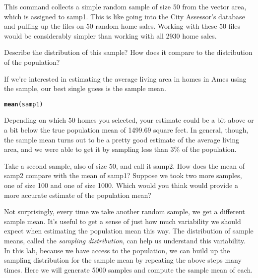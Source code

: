 \documentclass{article}\usepackage[]{graphicx}\usepackage[]{color}
\makeatletter
\newcommand{\hlstd}[1]{\textcolor[rgb]{0.345,0.345,0.345}{#1}}%
\newcommand{\hlkwd}[1]{\textcolor[rgb]{0.737,0.353,0.396}{\textbf{#1}}}%
\newenvironment{kframe}{%
 \def\at@end@of@kframe{}%
 \ifinner\ifhmode%
  \def\at@end@of@kframe{\end{minipage}}%
  \begin{minipage}{\columnwidth}%
 \fi\fi%
 \def\FrameCommand##1{\hskip\@totalleftmargin \hskip-\fboxsep
 \colorbox{shadecolor}{##1}\hskip-\fboxsep
     \hskip-\linewidth \hskip-\@totalleftmargin \hskip\columnwidth}%
 \MakeFramed {\advance\hsize-\width
   \@totalleftmargin\z@ \linewidth\hsize
   \@setminipage}}%
 {\par\unskip\endMakeFramed%
 \at@end@of@kframe}
\newenvironment{knitrout}{}{} %
\makeatother
\begin{document}
This command collects a simple random sample of size 50 from the vector \hlstd{area}, which is assigned to \hlstd{samp1}.  This is like going into the City Assessor's database and pulling up the files on 50 random home sales.  Working with these 50 files would be considerably simpler than working with all 2930 home sales.

\begin{exercise}
Describe the distribution of this sample? How does it compare to the distribution of the population?
\end{exercise}

If we're interested in estimating the average living area in homes in Ames using the sample, our best single guess is the sample mean.

\begin{knitrout}
\color{fgcolor}\begin{kframe}
\begin{alltt}
\hlkwd{mean}\hlstd{(samp1)}
\end{alltt}
\end{kframe}
\end{knitrout}


Depending on which 50 homes you selected, your estimate could be a bit above or a bit below the true population mean of 1499.69 square feet.  In general, though, the sample mean turns out to be a pretty good estimate of the average living area, and we were able to get it by sampling less than 3\% of the population.

\begin{exercise}
Take a second sample, also of size 50, and call it \hlstd{samp2}.  How does the mean of \hlstd{samp2} compare with the mean of \hlstd{samp1}?  Suppose we took two more samples, one of size 100 and one of size 1000. Which would you think would provide a more accurate estimate of the population mean?
\end{exercise}

Not surprisingly, every time we take another random sample, we get a different sample mean.  It's useful to get a sense of just how much variability we should expect when estimating the population mean this way. The distribution of sample means, called the \emph{sampling distribution}, can help us understand this variability. In this lab, because we have access to the population, we can build up the sampling distribution for the sample mean by repeating the above steps many times. Here we will generate 5000 samples and compute the sample mean of each.
\end{document}
